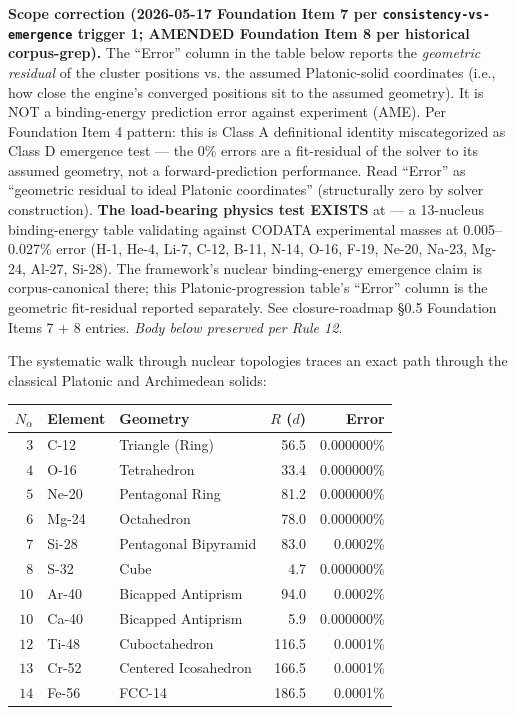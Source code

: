 \textbf{Scope correction (2026-05-17 Foundation Item 7 per \texttt{consistency-vs-emergence} trigger 1; AMENDED Foundation Item 8 per historical corpus-grep).} The ``Error'' column in the table below reports the \textit{geometric residual} of the cluster positions vs. the assumed Platonic-solid coordinates (i.e., how close the engine's converged positions sit to the assumed geometry). It is NOT a binding-energy prediction error against experiment (AME). Per Foundation Item 4 pattern: this is Class A definitional identity miscategorized as Class D emergence test — the 0\% errors are a fit-residual of the solver to its assumed geometry, not a forward-prediction performance. Read ``Error'' as ``geometric residual to ideal Platonic coordinates'' (structurally zero by solver construction). \textbf{The load-bearing physics test EXISTS} at  --- a 13-nucleus binding-energy table validating against CODATA experimental masses at 0.005--0.027\% error (H-1, He-4, Li-7, C-12, B-11, N-14, O-16, F-19, Ne-20, Na-23, Mg-24, Al-27, Si-28). The framework's nuclear binding-energy emergence claim is corpus-canonical there; this Platonic-progression table's ``Error'' column is the geometric fit-residual reported separately. See closure-roadmap \S0.5 Foundation Items 7 + 8 entries. \textit{Body below preserved per Rule 12.}

The systematic walk through nuclear topologies traces an exact path through the classical Platonic and Archimedean solids:

\begin{center}
\renewcommand{\arraystretch}{1.3}
\begin{tabular}{r l l r r}
\toprule
\textbf{$N_\alpha$} & \textbf{Element} & \textbf{Geometry} & \textbf{$R$ ($d$)} & \textbf{Error} \\
\midrule
$3$  & C-12  & Triangle (Ring)        & 56.5  & 0.000000\% \\
$4$  & O-16  & Tetrahedron            & 33.4  & 0.000000\% \\
$5$  & Ne-20 & Pentagonal Ring        & 81.2  & 0.000000\% \\
$6$  & Mg-24 & Octahedron             & 78.0  & 0.000000\% \\
$7$  & Si-28 & Pentagonal Bipyramid   & 83.0  & 0.0002\%   \\
$8$  & S-32  & Cube                   & 4.7   & 0.000000\% \\
$10$ & Ar-40 & Bicapped Antiprism     & 94.0  & 0.0002\%   \\
$10$ & Ca-40 & Bicapped Antiprism     & 5.9   & 0.000000\% \\
$12$ & Ti-48 & Cuboctahedron          & 116.5 & 0.0001\%   \\
$13$ & Cr-52 & Centered Icosahedron   & 166.5 & 0.0001\%   \\
$14$ & Fe-56 & FCC-14                 & 186.5 & 0.0001\%   \\
\bottomrule
\end{tabular}
\end{center}

